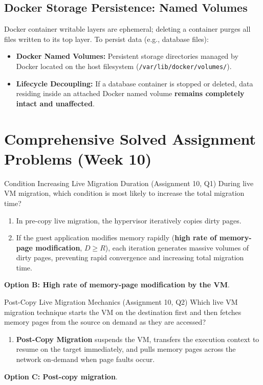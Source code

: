 \subsection{Docker Storage Persistence: Named Volumes}
Docker container writable layers are ephemeral; deleting a container purges all files written to its top layer. To persist data (e.g., database files):
\begin{itemize}[leftmargin=*]
  \item \textbf{Docker Named Volumes:} Persistent storage directories managed by Docker located on the host filesystem (\texttt{/var/lib/docker/volumes/}).
  \item \textbf{Lifecycle Decoupling:} If a database container is stopped or deleted, data residing inside an attached Docker named volume \textbf{remains completely intact and unaffected}.
\end{itemize}

\section{Comprehensive Solved Assignment Problems (Week 10)}

\begin{solved}{Condition Increasing Live Migration Duration (Assignment 10, Q1)}
\Given During live VM migration, which condition is most likely to increase the total migration time?
\Steps
\begin{enumerate}[leftmargin=*]
  \item In pre-copy live migration, the hypervisor iteratively copies dirty pages.
  \item If the guest application modifies memory rapidly (\textbf{high rate of memory-page modification}, $D \ge R$), each iteration generates massive volumes of dirty pages, preventing rapid convergence and increasing total migration time.
\end{enumerate}
\Answer \textbf{Option B: High rate of memory-page modification by the VM}.
\end{solved}

\begin{solved}{Post-Copy Live Migration Mechanics (Assignment 10, Q2)}
\Given Which live VM migration technique starts the VM on the destination first and then fetches memory pages from the source on demand as they are accessed?
\Steps
\begin{enumerate}[leftmargin=*]
  \item \textbf{Post-Copy Migration} suspends the VM, transfers the execution context to resume on the target immediately, and pulls memory pages across the network on-demand when page faults occur.
\end{enumerate}
\Answer \textbf{Option C: Post-copy migration}.
\end{solved}

